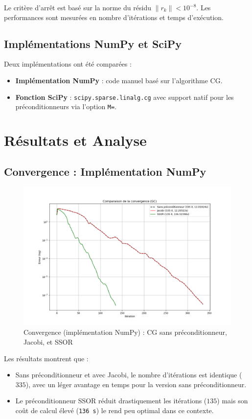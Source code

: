 \documentclass[12pt,a4paper]{article}
\begin{document}
    Le critère d'arrêt est basé sur la norme du résidu $\|r_k\| < 10^{-8}$. Les performances sont mesurées en nombre d’itérations et temps d’exécution.

    \subsection{Implémentations NumPy et SciPy}
    Deux implémentations ont été comparées :
    \begin{itemize}
        \item \textbf{Implémentation NumPy} : code manuel basé sur l’algorithme CG.
        \item \textbf{Fonction SciPy} : \texttt{scipy.sparse.linalg.cg} avec support natif pour les préconditionneurs via l’option \texttt{M=}.
    \end{itemize}
    \newpage
    \section{Résultats et Analyse}

    \subsection{Convergence : Implémentation NumPy}
    \begin{figure}[h!]
        \centering
        \includegraphics[width=\textwidth]{Comparaison_de_la_convergence_numpy.png}
        \caption{Convergence (implémentation NumPy) : CG sans préconditionneur, Jacobi, et SSOR}
        \label{fig:convergence_numpy}
    \end{figure}

    Les résultats montrent que :
    \begin{itemize}
        \item Sans préconditionneur et avec Jacobi, le nombre d’itérations est identique ($335$), avec un léger avantage en temps pour la version sans préconditionneur.
        \item Le préconditionneur SSOR réduit drastiquement les itérations ($135$) mais son coût de calcul élevé (\texttt{136 s}) le rend peu optimal dans ce contexte.
    \end{itemize}
    \vspace{1cm}
    \newpage
\end{document}

